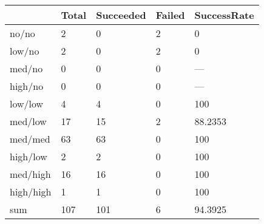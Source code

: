 \begin{tabular}{lllll}
& Total & Succeeded & Failed & SuccessRate \\ 
\hline 
no/no & 2 & 0 & 2 & 0 \\ 
low/no & 2 & 0 & 2 & 0 \\ 
med/no & 0 & 0 & 0 & --- \\ 
high/no & 0 & 0 & 0 & --- \\ 
low/low & 4 & 4 & 0 & 100 \\ 
med/low & 17 & 15 & 2 & 88.2353 \\ 
med/med & 63 & 63 & 0 & 100 \\ 
high/low & 2 & 2 & 0 & 100 \\ 
med/high & 16 & 16 & 0 & 100 \\ 
high/high & 1 & 1 & 0 & 100 \\ 
sum & 107 & 101 & 6 & 94.3925 \\ 
\hline 
\end{tabular}